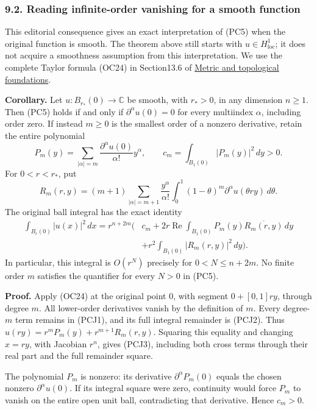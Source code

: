 \documentclass[
  11pt,
]{article}
\begin{document}
\subsubsection{9.2. Reading infinite-order vanishing for a smooth
function}\label{reading-infinite-order-vanishing-for-a-smooth-function}

This editorial consequence gives an exact interpretation of (PC5) when
the original function is smooth. The theorem above still starts with
\(u\in H^1_{\mathrm{loc}}\); it does not acquire a smoothness assumption
from this interpretation. We use the complete Taylor formula (OC24) in
Section13.6 of \href{metric-foundation-bridges.pdf}{Metric and
topological foundations}.

\textbf{Corollary.} Let \(u:B_{r_*}(0)\to\mathbb C\) be smooth, with
\(r_*>0\), in any dimension \(n\geq1\). Then (PC5) holds if and only if
\(\partial^\alpha u(0)=0\) for every multiindex \(\alpha\), including
order zero. If instead \(m\geq0\) is the smallest order of a nonzero
derivative, retain the entire polynomial \[
 P_m(y)=\sum_{|\alpha|=m}\frac{\partial^\alpha u(0)}{\alpha!}y^\alpha,
 \qquad c_m=\int_{B_1(0)}|P_m(y)|^2\,dy>0.       \tag{PCJ1}
\] For \(0<r<r_*\), put \[
 R_m(r,y)=(m+1)\sum_{|\alpha|=m+1}\frac{y^\alpha}{\alpha!}
   \int_0^1(1-\theta)^m\partial^\alpha u(\theta r y)\,d\theta.
                                                        \tag{PCJ2}
\] The original ball integral has the exact identity \[
 \begin{split}
 \int_{B_r(0)}|u(x)|^2\,dx
 =r^{n+2m}\bigg(&c_m
   +2r\operatorname{Re}\int_{B_1(0)}P_m(y)\overline{R_m(r,y)}\,dy\\
   &+r^2\int_{B_1(0)}|R_m(r,y)|^2\,dy\bigg).
 \end{split}                                             \tag{PCJ3}
\] In particular, this integral is \(O(r^N)\) precisely for
\(0<N\leq n+2m\). No finite order \(m\) satisfies the quantifier for
every \(N>0\) in (PC5).

\textbf{Proof.} Apply (OC24) at the original point \(0\), with segment
\(0+[0,1]ry\), through degree \(m\). All lower-order derivatives vanish
by the definition of \(m\). Every degree-\(m\) term remains in (PCJ1),
and its full integral remainder is (PCJ2). Thus
\(u(ry)=r^mP_m(y)+r^{m+1}R_m(r,y)\). Squaring this equality and changing
\(x=ry\), with Jacobian \(r^n\), gives (PCJ3), including both cross
terms through their real part and the full remainder square.

The polynomial \(P_m\) is nonzero: its derivative
\(\partial^\alpha P_m(0)\) equals the chosen nonzero
\(\partial^\alpha u(0)\). If its integral square were zero, continuity
would force \(P_m\) to vanish on the entire open unit ball,
contradicting that derivative. Hence \(c_m>0\).
\end{document}
